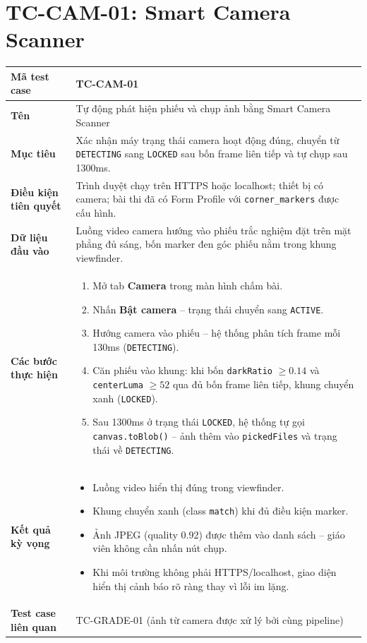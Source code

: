\section*{TC-CAM-01: Smart Camera Scanner}

\begin{longtable}{|L{3.5cm}|L{10.5cm}|}
\hline
\textbf{Mã test case} & TC-CAM-01 \\
\hline
\textbf{Tên} & Tự động phát hiện phiếu và chụp ảnh bằng Smart Camera Scanner \\
\hline
\textbf{Mục tiêu} & Xác nhận máy trạng thái camera hoạt động đúng, chuyển từ \texttt{DETECTING} sang \texttt{LOCKED} sau bốn frame liên tiếp và tự chụp sau 1300ms. \\
\hline
\textbf{Điều kiện tiên quyết} & Trình duyệt chạy trên HTTPS hoặc localhost; thiết bị có camera; bài thi đã có Form Profile với \texttt{corner\_markers} được cấu hình. \\
\hline
\textbf{Dữ liệu đầu vào} & Luồng video camera hướng vào phiếu trắc nghiệm đặt trên mặt phẳng đủ sáng, bốn marker đen góc phiếu nằm trong khung viewfinder. \\
\hline
\textbf{Các bước thực hiện} &
\begin{enumerate}[leftmargin=1em]
  \item Mở tab \textbf{Camera} trong màn hình chấm bài.
  \item Nhấn \textbf{Bật camera} -- trạng thái chuyển sang \texttt{ACTIVE}.
  \item Hướng camera vào phiếu -- hệ thống phân tích frame mỗi 130ms (\texttt{DETECTING}).
  \item Căn phiếu vào khung: khi bốn \texttt{darkRatio} $\geq 0.14$ và \texttt{centerLuma} $\geq 52$ qua đủ bốn frame liên tiếp, khung chuyển xanh (\texttt{LOCKED}).
  \item Sau 1300ms ở trạng thái \texttt{LOCKED}, hệ thống tự gọi \texttt{canvas.toBlob()} -- ảnh thêm vào \texttt{pickedFiles} và trạng thái về \texttt{DETECTING}.
\end{enumerate} \\
\hline
\textbf{Kết quả kỳ vọng} &
\begin{itemize}[leftmargin=1em]
  \item Luồng video hiển thị đúng trong viewfinder.
  \item Khung chuyển xanh (class \texttt{match}) khi đủ điều kiện marker.
  \item Ảnh JPEG (quality 0.92) được thêm vào danh sách -- giáo viên không cần nhấn nút chụp.
  \item Khi môi trường không phải HTTPS/localhost, giao diện hiển thị cảnh báo rõ ràng thay vì lỗi im lặng.
\end{itemize} \\
\hline
\textbf{Test case liên quan} & TC-GRADE-01 (ảnh từ camera được xử lý bởi cùng pipeline) \\
\hline
\end{longtable}
